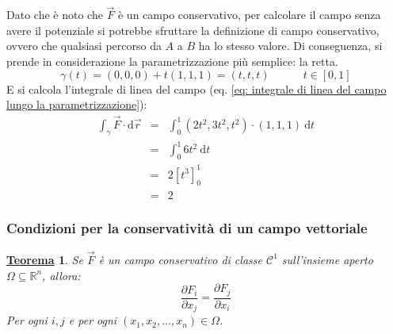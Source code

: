\documentclass[a4paper]{article}
\newtheorem{theorem}{\textcolor{Red3}{\underline{Teorema}}}
\begin{document}
	\noindent
	Dato che è noto che $\overset{\rightarrow}{F}$ è un campo conservativo, per calcolare il campo senza avere il potenziale si potrebbe sfruttare la definizione di campo conservativo, ovvero che qualsiasi percorso da $A$ a $B$ ha lo stesso valore. Di conseguenza, si prende in considerazione la parametrizzazione più semplice: la retta.
	\begin{equation*}
		\gamma\left(t\right) = \left(0,0,0\right) + t\left(1,1,1\right) = \left(t,t,t\right) \hspace{3em} t\in\left[0,1\right]
	\end{equation*}
	E si calcola l'integrale di linea del campo (eq. \ref{eq: integrale di linea del campo lungo la parametrizzazione}):
	\begin{equation*}
		\begin{array}{rcl}
			\displaystyle\int_{\gamma} \overset{\rightarrow}{F} \cdot \mathrm{d}\overset{\rightarrow}{r}
			&=&
			\displaystyle\int_{0}^{1} \left(2t^{2},3t^{2},t^{2}\right) \cdot \left(1,1,1\right) \:\mathrm{d}t \\ [1em]
			&=&
			\displaystyle\int_{0}^{1} 6t^{2} \:\mathrm{d}t \\ [1em]
			&=&
			2\left[t^{3}\right]_{0}^{1} \\ [.5em]
			&=&
			2
		\end{array}
	\end{equation*}\newpage

	\subsubsection{Condizioni per la conservatività di un campo vettoriale}

	\begin{theorem}
		Se $\overset{\rightarrow}{F}$ è un campo conservativo di classe $\mathcal{C}^{1}$ sull'insieme aperto $\Omega \subseteq \mathbb{R}^{n}$, allora:
		\begin{equation}
			\dfrac{\partial F_{i}}{\partial x_{j}} = \dfrac{\partial F_{j}}{\partial x_{i}}
		\end{equation}
		Per ogni $i,j$ e per ogni $\left(x_{1}, x_{2}, \dots, x_{n}\right) \in \Omega$.
	\end{theorem}
\end{document}
